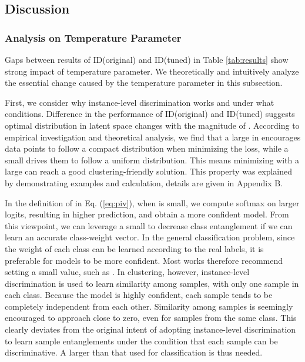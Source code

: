 \documentclass{article} \usepackage{iclr2021_conference,times}
\begin{document}
\subsection{Discussion}
\subsubsection{Analysis on Temperature Parameter}
\label{subsubsec:analyzeTau}
Gaps between results of ID(original) and ID(tuned) in Table \ref{tab:results} show strong impact of temperature parameter. 
We theoretically and intuitively analyze the essential change caused by the temperature parameter in this subsection.


First, we consider why instance-level discrimination works and under what conditions.
Difference in the performance of ID(original) and ID(tuned) suggests optimal distribution in latent space changes with the magnitude of . According to empirical investigation and theoretical analysis, we find that a large  in  encourages data points to follow a compact distribution when minimizing the loss, while a small  drives them to follow a uniform distribution. This means minimizing  with a large  can reach a good clustering-friendly solution. This property was explained by demonstrating examples and calculation, details are given in Appendix B.






In the definition of  in Eq. (\ref{eq:piv}), when  is small, we compute softmax on larger logits, resulting in higher prediction, and obtain a more confident model. 
From this viewpoint, we can leverage a small  to decrease class entanglement if we can learn an accurate class-weight vector. In the general classification problem, since the weight of each class can be learned according to the real labels, it is preferable for models to be more confident. Most works therefore recommend setting a small value, such as  \cite{wu2018unsupervised}. 
In clustering, however, instance-level discrimination is used to learn similarity among samples, with only one sample in each class. Because the model is highly confident, 
each sample tends to be completely independent from each other. Similarity among samples is seemingly encouraged to approach close to zero, even for samples from the same class. This clearly deviates from the original intent of adopting instance-level discrimination to learn sample entanglements under the condition that each sample can be discriminative. A larger  than that used for classification is thus needed.
\end{document}
